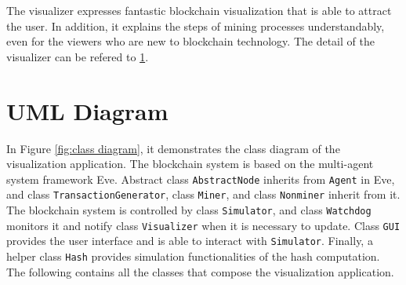 The visualizer expresses fantastic blockchain visualization that is able to attract the user. In addition, it explains the steps of mining processes understandably, even for the viewers who are new to blockchain technology. The detail of the visualizer can be refered to \ref{sec:uml diagram}.

\section{UML Diagram}
\label{sec:uml diagram}

In Figure \ref{fig:class diagram}, it demonstrates the class diagram of the visualization application. The blockchain system is based on the multi-agent system framework Eve. Abstract class \texttt{AbstractNode} inherits from \texttt{Agent} in Eve, and class \texttt{TransactionGenerator}, class \texttt{Miner}, and class \texttt{Nonminer} inherit from it. The blockchain system is controlled by class \texttt{Simulator}, and class \texttt{Watchdog} monitors it and notify class \texttt{Visualizer} when it is necessary to update. Class \texttt{GUI} provides the user interface and is able to interact with \texttt{Simulator}. Finally, a helper class \texttt{Hash} provides simulation functionalities of the hash computation. The following contains all the classes that compose the visualization application.

